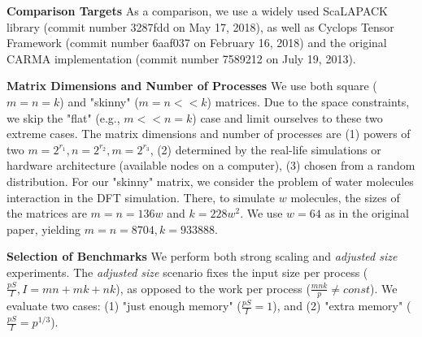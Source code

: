 \documentclass[sigplan,review,anonymous]{acmart}\settopmatter{printfolios=true,printccs=false,printacmref=false}
\newcommand\mac[1]{\textcolor{red}{[Mac: #1]}}
\newcommand{\macb}[1]{\textbf{\textsf{#1}}}
\begin{document}

\macb{Comparison Targets}
%
As a comparison, we use a widely used ScaLAPACK library (commit number 3287fdd 
on May 17, 2018), as well 
as Cyclops Tensor Framework (commit number 6aaf037 on February 16, 2018) and 
the original CARMA implementation (commit number 7589212 on July 19, 2013).

\macb{Matrix Dimensions and Number of Processes}
We use both square ($m = n = k$) and "skinny" ($m = n << k$) matrices. Due to 
the space constraints, we skip the "flat" (e.g., $m << n = k$) case and limit 
ourselves to these two extreme cases. The matrix dimensions and number of 
processes are (1) powers of 
two $m = 2^{r_1}, n = 2^{r_2}, m = 2^{r_3}$, (2) determined by the real-life 
simulations or hardware architecture (available nodes on a computer), (3) 
chosen from a random distribution. 
For our "skinny" matrix, we consider the problem of 
water 
molecules interaction in the DFT
simulation\cite{joost}. There, to simulate $w$ molecules, the sizes 
of the 
matrices are $m=n=136w$ and $k = 228w^2$. We use $w=64$ as in the 
original paper, yielding $m=n=8704, k = 933888$.

\macb{Selection of Benchmarks}
%
We perform both strong scaling and \emph{adjusted size} experiments. 
The \emph{adjusted size} scenario fixes the input size per process 
($\frac{pS}{I}, I = mn + mk + nk$), as opposed to the work per 
process ($\frac{mnk}{p} \ne const$). We evaluate two cases: (1) "just enough 
memory" ($\frac{pS}{I} = 1$), and (2) "extra memory"  ($\frac{pS}{I} = 
p^{1/3}$).
%
%
%
\end{document}
